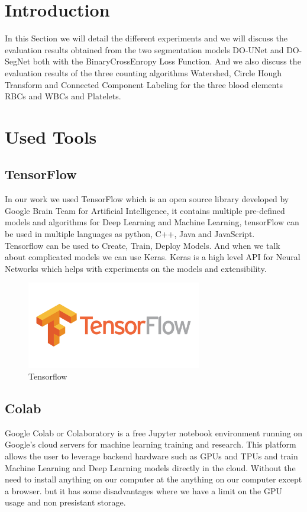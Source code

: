 \section{Introduction}
\vspace{0.2in}
\hspace*{0.16in}
In this Section we will detail the different experiments and we will discuss the evaluation results obtained from the two segmentation models DO-UNet and DO-SegNet both with the BinaryCrossEnropy Loss Function. And we also discuss the evaluation results of the three counting algorithms Watershed, Circle Hough Transform and Connected Component Labeling for the three blood elements RBCs and WBCs and Platelets.

\section{Used Tools}
\subsection{TensorFlow}
In our work we used TensorFlow which is an open source library developed by Google Brain Team for Artificial Intelligence, it contains multiple pre-defined models and algorithms for Deep Learning and Machine Learning, tensorFlow can be used in multiple languages as python, C++, Java and JavaScript.\\
Tensorflow can be used to Create, Train, Deploy Models. And when we talk about complicated models we can use Keras.
Keras is a high level API for Neural Networks which helps with experiments on the models and extensibility.

\begin{figure}[H]
    \centering
      \vspace{-0.1in}
        \centerline{\includegraphics[width = 3in]{../images/tensorflow.png}}
        \caption{Tensorflow}
        \label{Tensorflow}
    \end{figure}

\subsection{Colab}
Google Colab or Colaboratory is a free Jupyter notebook environment running on Google's cloud servers for machine learning training and research. This platform allows the user to leverage backend hardware such as GPUs and TPUs and train Machine Learning and Deep Learning models directly in the cloud. Without the need to install anything on our computer at the anything on our computer except a browser.
but it has some disadvantages where we have a limit on the GPU usage
and non presistant storage.

